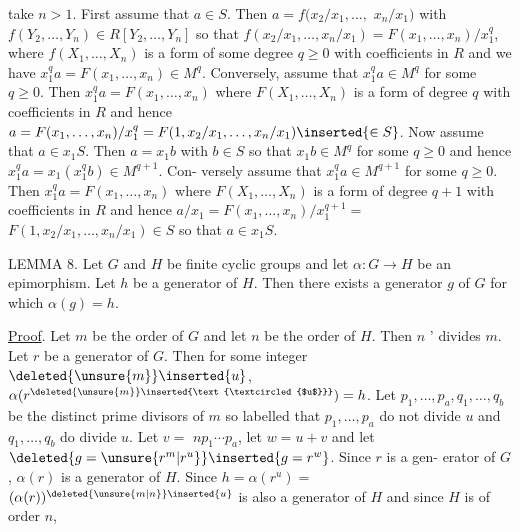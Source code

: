 take $n>1$. First assume that $a\in S$. Then $a=f(x_2/x_1,\ldots,$
$x_n/x_1)$ with $f(Y_2,\ldots,Y_n)\in R[Y_2,\ldots,Y_n]$ so that
$f(x_2/x_1,\ldots,x_n/x_1)=F(x_1,\ldots,x_n)/x_1^q$, where $f(X_1,\ldots,X_n)$
is a form of some degree $q\ge0$ with coefficients in $R$ and
we have $x_1^q a=F(x_1,\ldots,x_n)\in M^q$. Conversely, assume that
$x_1^q a\in M^q$ for some $q\ge0$. Then $x_1^q a=F(x_1,\ldots,x_n)$ where
$F(X_1,\ldots,X_n)$ is a form of degree $q$ with coefficients in $R$
and hence $a=F(x_1,\ldots,x_n)/x_1^q=F(1,x_2/x_1,\ldots,x_n/x_1)\inserted{\in S}$. Now
assume that $a\in x_1S$. Then $a=x_1b$ with $b\in S$ so that
$x_1b\in M^q$ for some $q\ge0$ and hence $x_1^q a=x_1(x_1^q b)\in M^{q+1}$. Con-
versely assume that $x_1^q a\in M^{q+1}$ for some $q\ge0$. Then
$x_1^q a=F(x_1,\ldots,x_n)$ where $F(X_1,\ldots,X_n)$ is a form of degree
$q+1$ with coefficients in $R$ and hence $a/x_1=F(x_1,\ldots,x_n)/x_1^{q+1}=$
$F(1,x_2/x_1,\ldots,x_n/x_1)\in S$ so that $a\in x_1S$.

LEMMA 8. Let $G$ and $H$ be finite cyclic groups and
let $\alpha:G\longrightarrow H$ be an epimorphism. Let $h$ be a
generator of $H$. Then there exists a generator $g$ of
$G$ for which $\alpha(g)=h$.

\uline{Proof}. Let $m$ be the order of $G$ and let $n$ be the order
of $H$. Then $n$ ' divides $m$. Let $r$ be a generator of $G$. Then
for some integer $\deleted{\unsure{m}}\inserted{u}$, $\alpha(r^{\deleted{\unsure{m}}\inserted{\text{\textcircled{$u$}}}})=h$. Let $p_1,\ldots,p_a,q_1,\ldots,q_b$
be the distinct prime divisors of $m$ so labelled that $p_1,\ldots,p_a$
do not divide $u$ and $q_1,\ldots,q_b$ do divide $u$. Let $v=$
$np_1\cdots p_a$, let $w=u+v$ and let $\deleted{g=\unsure{r^m|r^u}}\inserted{g=r^w}$. Since $r$ is a gen-
erator of $G$, $\alpha(r)$ is a generator of $H$. Since $h=\alpha(r^u)=$
$(\alpha(r))^{\deleted{\unsure{m|n}}\inserted{u}}$ is also a generator of $H$ and since $H$ is of order $n$,
